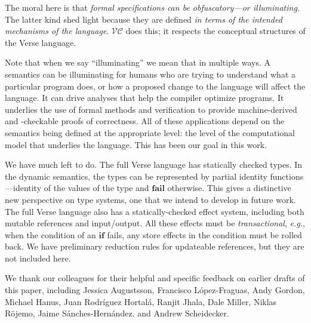 \documentclass[acmsmall,review,dvipsnames]{acmart}
\newcommand{\eg}{\emph{e.g.}}
\newcommand{\versecalc}{$\mathcal{VC}$}
\begin{document}
The moral here is that \emph{formal specifications can be obfuscatory---or
illuminating.} The latter kind shed light because they are defined \emph{in
terms of the intended mechanisms of the language}. \versecalc{} does this; it
respects the conceptual structures of the Verse language.

Note that when we say ``illuminating'' we mean that in multiple ways.
A semantics can be illuminating for humans who are trying to understand
what a particular program does, or how a proposed change to the language
will affect the language. It can drive analyses that help the compiler
optimize programs. It underlies the use of formal methods and verification
to provide machine-derived and -checkable proofs of correctness. All of
these applications depend on the semantics being defined at the appropriate
level: the level of the computational model that underlies the language.
This has been our goal in this work.

We have much left to do.  The full Verse language has
statically checked types.  In the dynamic semantics, the types can be
represented by partial identity functions---identity of the values of
the type and \ensuremath{\textbf{fail}} otherwise.  This gives a distinctive new
perspective on type systems, one that we intend to develop in future
work.  The full Verse language also has a statically-checked effect system,
including both mutable references and input/output.  All these effects
must be \emph{transactional}, {\eg}, when the condition of an \ensuremath{\textbf{if}}
fails, any store effects in the condition must be rolled back.
We have preliminary reduction rules for updateable references,
but they are not included here.

\begin{acks}                            %
  We thank our colleagues for their helpful and specific
  feedback on earlier drafts of this paper,
  including
  Jessica Augustsson,
  Francisco L\'opez-Fraguas,
  Andy Gordon,
  Michael Hanus,
  Juan Rodr\'iguez Hortal\'a,
  Ranjit Jhala,
  Dale Miller,
  Niklas R\"ojemo,
  Jaime S\'anches-Hern\'andez.
  and Andrew Scheidecker.
\end{acks}



\iffalse
\end{document}
